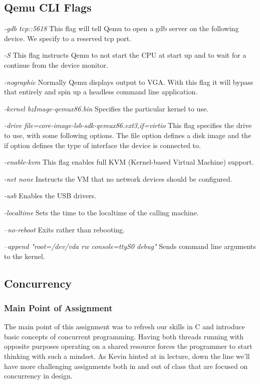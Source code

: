 \documentclass[10pt,draftclsnofoot,onecolumn]{IEEEtran}
\begin{document}
\subsection{Qemu CLI Flags}
\textit{-gdb tcp::5618}
This flag will tell Qemu to open a gdb server on the following device.
We specify to a reserved tcp port.

\textit{-S}
This flag instructs Qemu to not start the CPU at start up and to wait for a continue from the device monitor.

\textit{-nographic}
Normally Qemu displays output to VGA.
With this flag it will bypass that entirely and spin up a headless command line application.

\textit{-kernel bzImage-qemux86.bin}
Specifies the particular kernel to use.

\textit{-drive file=core-image-lsb-sdk-qemux86.ext3,if=virtio}
This flag specifies the drive to use, with some following options.
The file option defines a disk image and the if option defines the type of interface the device is connected to.

\textit{-enable-kvm}
This flag enables full KVM (Kernel-based Virtual Machine) support.

\textit{-net none}
Instructs the VM that no network devices should be configured.

\textit{-usb}
Enables the USB drivers.

\textit{-localtime}
Sets the time to the localtime of the calling machine.

\textit{--no-reboot}
Exits rather than rebooting.

\textit{--append "root=/dev/vda rw console=ttyS0 debug"}
Sends command line arguments to the kernel.

\subsection{Concurrency}
\subsubsection{Main Point of Assignment}
The main point of this assignment was to refresh our skills in C and introduce basic concepts of concurrent programming.
Having both threads running with opposite purposes operating on a shared resource forces the programmer to start thinking with such a mindset.
As Kevin hinted at in lecture, down the line we'll have more challenging assignments both in and out of class that are focused on concurrency in design.
\end{document}
